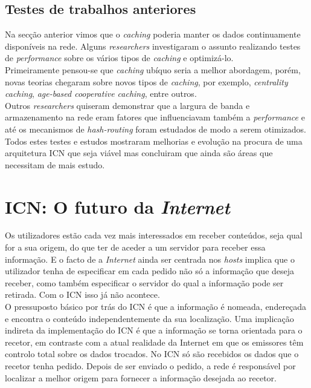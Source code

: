 \documentclass[conference]{IEEEtran}
\begin{document}
\subsection{Testes de trabalhos anteriores}

Na sec\c{c}\~{a}o anterior vimos que o \textit{caching} poderia manter os dados continuamente dispon\'{i}veis na rede. Alguns \textit{researchers} investigaram o assunto\cite{cachingicn} realizando testes de \textit{performance} sobre os v\'{a}rios tipos de \textit{caching} e optimizá-lo\cite{probcaching}.\\


Primeiramente pensou-se que \textit{caching} ub\'{i}quo seria a melhor abordagem, por\'{e}m, novas teorias chegaram sobre novos tipos de \textit{caching}, por exemplo,  \textit{centrality caching}\cite{lessMore}, \textit{age-based cooperative caching}\cite{agebased}, entre outros.\\


Outros \textit{researchers} quiseram demonstrar que a largura de banda e armazenamento na rede eram fatores que influenciavam também a \textit{performance}\cite{modeling}\cite{bandstorage} e até os mecanismos de \textit{hash-routing} foram estudados de modo a serem otimizados\cite{hashrouting}.\\

Todos estes testes e estudos mostraram melhorias e evolução na procura de uma arquitetura ICN que seja viável mas concluiram que ainda são áreas que necessitam de mais estudo.\\


\section{ICN: O futuro da \textit{Internet}}

Os utilizadores est\~{a}o cada vez mais interessados em receber conte\'{u}dos, seja qual for a sua origem, do que ter de aceder a um servidor para receber essa informa\c{c}\~{a}o. E o facto de a \textit{Internet} ainda ser centrada nos \textit{hosts} implica que o utilizador tenha de especificar em cada pedido n\~{a}o s\'{o} a informa\c{c}\~{a}o que deseja receber, como tamb\'{e}m especificar o servidor do qual a informa\c{c}\~{a}o pode ser retirada. Com o ICN isso j\'{a} n\~{a}o acontece\cite{surveyICN}.\\

O pressuposto b\'{a}sico por tr\'{a}s do ICN \'{e} que a informa\c{c}\~{a}o \'{e} nomeada, endere\c{c}ada e encontra o conte\'{u}do independentemente da sua localiza\c{c}\~{a}o. Uma implica\c{c}\~{a}o indireta da implementa\c{c}\~{a}o do ICN \'{e} que a informa\c{c}\~{a}o se torna orientada para o recetor, em contraste com a atual realidade da Internet em que os emissores t\^{e}m controlo total sobre os dados trocados\cite{publishSubscribe}. No ICN s\'{o} s\~{a}o recebidos os dados que o recetor tenha pedido. Depois de ser enviado o pedido, a rede \'{e} respons\'{a}vel por localizar a melhor origem para fornecer a informa\c{c}\~{a}o desejada ao recetor.\\
\end{document}
